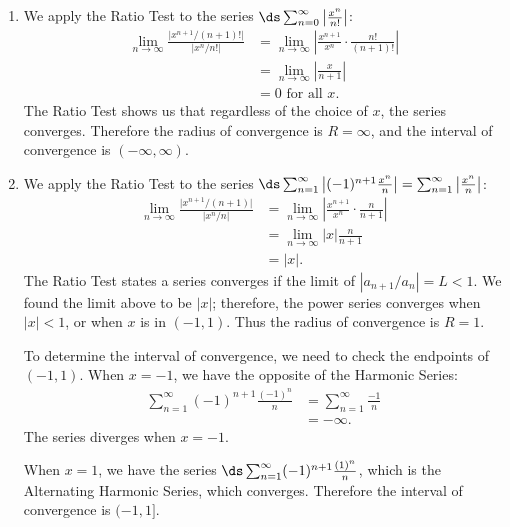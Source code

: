 {\begin{enumerate}
	\item We apply the Ratio Test to the series $\ds \sum_{n=0}^\infty \left|\frac{x^n}{n!}\right|$:
		\begin{align*}
		\lim_{n\to\infty} \frac{\big|x^{n+1}/(n+1)!\big|}{\big|x^n/n!\big|} &= \lim_{n\to\infty} \left|\frac{x^{n+1}}{x^n}\cdot\frac{n!}{(n+1)!}\right|\\
			&= \lim_{n\to\infty} \left|\frac x{n+1}\right|\\
			&= 0 \text{ for all } x.
		\end{align*}
		The Ratio Test shows us that regardless of the choice of $x$, the series converges. Therefore the radius of convergence is $R=\infty$, and the interval of convergence is $(-\infty,\infty)$.
		
	\item		We apply the Ratio Test to the series $\ds \sum_{n=1}^\infty \left|(-1)^{n+1}\frac{x^n}{n}\right| = \sum_{n=1}^\infty \left|\frac{x^n}{n}\right|$:
	\begin{align*}
	\lim_{n\to\infty} \frac{\big|x^{n+1}/(n+1)\big|}{\big|x^n/n\big|} &= \lim_{n\to\infty} \left|\frac{x^{n+1}}{x^n}\cdot \frac{n}{n+1}\right| \\
			&= \lim_{n\to\infty} |x|\frac{n}{n+1}\\
			&= |x|.
	\end{align*}
	The Ratio Test states a series converges if the limit of $|a_{n+1}/a_n| = L<1$. We found the limit above to be $|x|$; therefore, the power series converges when $|x| <1$, or when $x$ is in $(-1,1)$. Thus the radius of convergence is $R=1$.
	
	To determine the interval of convergence, we need to check the endpoints of $(-1,1)$. When $x=-1$, we have the opposite of the Harmonic Series:
	\begin{align*}
	\sum_{n=1}^\infty (-1)^{n+1}\frac{(-1)^n}{n} &= \sum_{n=1}^\infty \frac{-1}{n}\\
				&= -\infty.
	\end{align*}
	The series diverges when $x=-1$.
	
	When $x=1$, we have the series $\ds \sum_{n=1}^\infty (-1)^{n+1}\frac{(1)^n}{n}$, which is the Alternating Harmonic Series, which converges. Therefore the interval of convergence is $(-1,1]$.
	

\end{enumerate}}

